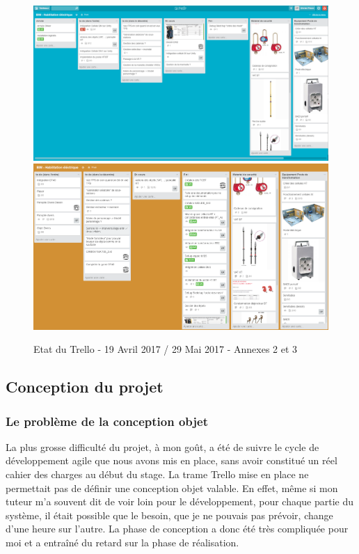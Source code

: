 \documentclass[a4paper]{article}
\begin{document}
     \begin{figure}[H]
        \centering
        \includegraphics[scale=0.15]{img/trello1}
        \includegraphics[scale=0.15]{img/trello2}
        \caption{Etat du Trello - 19 Avril 2017 / 29 Mai 2017 - Annexes 2 et 3}
     \end{figure} 

    \subsection{Conception du projet}

    \subsubsection{Le problème de la conception objet}

    La plus grosse difficulté du projet, à mon goût, a été de suivre le cycle de développement agile que nous avons mis en place, sans avoir constitué un réel cahier des charges au début du stage. La trame Trello mise en place ne permettait pas de définir une conception objet valable. En effet, même si mon tuteur m'a souvent dit de voir loin pour le développement, pour chaque partie du système, il était possible que le besoin, que je ne pouvais pas prévoir, change d'une heure sur l'autre. La phase de conception a donc été très compliquée pour moi et a entraîné du retard sur la phase de réalisation. \\
    
\end{document}
